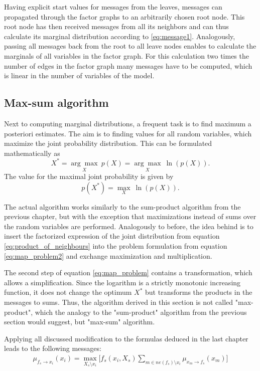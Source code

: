 \documentclass{sigkdd}
\begin{document}
Having explicit start values for messages from the leaves, messages can propagated through the factor graphs to an arbitrarily chosen root node. This root node has then received messages from all its neighbors and can thus calculate its marginal distribution according to \ref{eq:message1}. Analogously, passing all messages back from the root to all leave nodes enables to calculate the marginals of all variables in the factor graph. For this calculation two times the number of edges in the factor graph many messages have to be computed, which is linear in the number of variables of the model.\\

\subsection{Max-sum algorithm}
Next to computing marginal distributions, a frequent task is to find maximum a posteriori estimates. The aim is to finding values for all random variables, which maximize the joint probability distribution. This can be formulated mathematically as
\begin{equation}\label{eq:map_problem}
X^* = \underset{X}{\arg\max}~ p(X) = \underset{X}{\arg\max}~ \ln (p(X)).
\end{equation}
The value for the maximal joint probability is given by
\begin{equation}\label{eq:map_problem2}
p(X^*) = \underset{X}{\max}~ \ln (p(X)).
\end{equation}


The actual algorithm works similarly to the sum-product algorithm from the previous chapter, but with the exception that maximizations instead of sums over the random variables are performed. Analogously to before, the idea behind is to insert the factorized expression of the joint distribution from equation \ref{eq:product_of_neighbours} into the problem formulation from equation \ref{eq:map_problem2} and exchange maximization and multiplication.

The second step of equation \ref{eq:map_problem} contains a transformation, which allows a simplification. Since the logarithm is a strictly monotonic increasing function, it does not change the optimum $X^*$ but transforms the products in the messages to sums. Thus, the algorithm derived in this section is not called "max-product", which the analogy to the "sum-product" algorithm from the previous section would suggest, but "max-sum" algorithm.

Applying all discussed modification to the formulas deduced in the last chapter leads to the following messages:
\begin{equation}\label{eq:map_m1}
\begin{split}
\mu_{f_s \rightarrow x_i}(x_i) = \max_{X_s \setminus x_i} \Big[f_s(x_i, X_s) \sum_{m \in ne(f_s) \setminus x_i} \mu_{x_m \rightarrow f_s}(x_m) \Big]
\end{split}
\end{equation}
\end{document}
